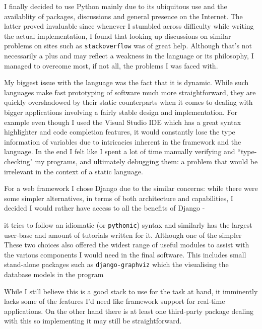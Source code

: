 \documentclass[bsc,frontabs,twoside,singlespacing,parskip,deptreport]{infthesis}     %
\begin{document}
	I finally decided to use Python mainly due to its ubiquitous use and the availablity of packages, discussions and general presence on the Internet. The latter proved invaluable since whenever I stumbled across difficulty while writing the actual implementation, I found that looking up discussions on similar problems on sites such as {\tt stackoverflow} was of great help. Although that's not necessarily a plus and may reflect a weakness in the language or its philosophy, I managed to overcome most, if not all, the problems I was faced with. 

	My biggest issue with the language was the fact that it is dynamic. While such languages make fast prototyping of software much more straightforward, they are quickly overshadowed by their static counterparts when it comes to dealing with bigger applications involving a fairly stable design and implementation. For example even though I used the Visual Studio IDE which has a great syntax highlighter and code completion features, it would constantly lose the type information of variables due to intricacies inherent in the framework and the language. In the end I felt like I spent a lot of time manually verifying and ``type-checking" my programs, and ultimately debugging them: a problem that would be irrelevant in the context of a static language. 
	
	For a web framework I chose Django due to the similar concerns: while there were some simpler alternatives, in terms of both architecture and capabilities, I decided I would rather have access to all the benefits of Django - 

it tries to follow an idiomatic (or {\tt pythonic}) syntax and similarly has the largest user-base and amount of tutorials written for it. Although one of the simpler 
	These two choices also offered the widest range of useful modules to assist with the various components I would need in the final software. This includes small stand-alone packages such as {\tt django-graphviz} which  the visualising the database models in the program  

While I still believe this is a good stack to use for the task at hand, it imminently lacks some of the features I’d need like framework support for real-time applications. On the other hand there is at least one third-party package dealing with this so implementing it may still be straightforward. 
	
\end{document}
